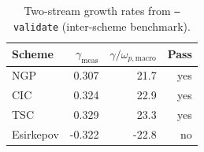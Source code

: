 \begin{table}[t]
\centering
\small
\caption{Two-stream growth rates from \texttt{--validate} (inter-scheme benchmark).}
\label{tab:twostream_sim}
\begin{tabular}{lrrr}
\toprule
Scheme & $\gamma_{\mathrm{meas}}$ & $\gamma/\omega_{p,\mathrm{macro}}$ & Pass \\
\midrule
NGP & 0.307 & 21.7 & yes \\
CIC & 0.324 & 22.9 & yes \\
TSC & 0.329 & 23.3 & yes \\
Esirkepov & -0.322 & -22.8 & no \\
\bottomrule
\end{tabular}
\end{table}
